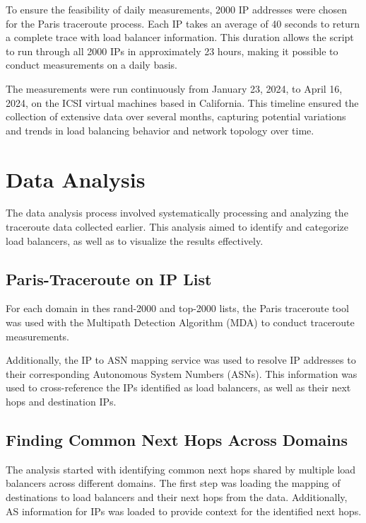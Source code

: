 \documentclass[12pt]{cwru_thesis}
\begin{document}
To ensure the feasibility of daily measurements, 2000 IP addresses were chosen for the Paris traceroute process. Each IP takes an average of 40 seconds to return a complete trace with load balancer information. This duration allows the script to run through all 2000 IPs in approximately 23 hours, making it possible to conduct measurements on a daily basis.

The measurements were run continuously from January 23, 2024, to April 16, 2024, on the ICSI virtual machines based in California. This timeline ensured the collection of extensive data over several months, capturing potential variations and trends in load balancing behavior and network topology over time.

\section{Data Analysis}

The data analysis process involved systematically processing and analyzing the traceroute data collected earlier. This analysis aimed to identify and categorize load balancers, as well as to visualize the results effectively.

\subsection{Paris-Traceroute on IP List}

For each domain in thes rand-2000 and top-2000 lists, the Paris traceroute tool was used with the Multipath Detection Algorithm (MDA) to conduct traceroute measurements. 

Additionally, the IP to ASN mapping service was used to resolve IP addresses to their corresponding Autonomous System Numbers (ASNs). This information was used to cross-reference the IPs identified as load balancers, as well as their next hops and destination IPs.


\subsection{Finding Common Next Hops Across Domains}

The analysis started with identifying common next hops shared by multiple load balancers across different domains. The first step was loading the mapping of destinations to load balancers and their next hops from the  data. Additionally, AS information for IPs was loaded to provide context for the identified next hops. 
\end{document}
